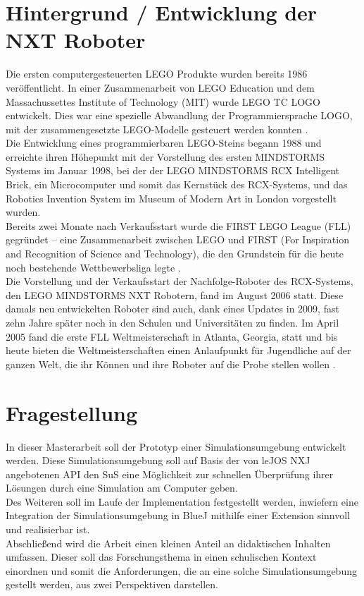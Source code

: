 \documentclass[paper=a4, pagesize, DIV=calc, BCOR=12.5mm, twoside=on, onecolumn=on, open = any, titlepage =on, parskip =half-, headsepline = on, footsepline = on, chapterprefix = on, appendixprefix = off, fontsize = 12pt, numbers = noenddot, abstract = on]{scrbook}
\numberwithin{equation}{chapter}
\begin{document}
\par \singlespacing
\section*{Hintergrund / Entwicklung der NXT Roboter}
\onehalfspacing
Die ersten computergesteuerten LEGO Produkte wurden bereits 1986 veröffentlicht. In einer Zusammenarbeit von LEGO Education und dem Massachussettes Institute of Technology (MIT) wurde LEGO TC LOGO entwickelt. Dies war eine spezielle Abwandlung der Programmiersprache LOGO, mit der zusammengesetzte LEGO-Modelle gesteuert werden konnten \cite{rolling:14}.\\
Die Entwicklung eines programmierbaren LEGO-Steins begann 1988 und erreichte ihren Höhepunkt mit der Vorstellung des ersten MINDSTORMS Systems im Januar 1998, bei der der LEGO MINDSTORMS RCX Intelligent Brick, ein Microcomputer und somit das Kernstück des RCX-Systems, und das Robotics Invention System im Museum of Modern Art in London vorgestellt wurden.\\
Bereits zwei Monate nach Verkaufsstart wurde die FIRST LEGO League (FLL) gegründet -- eine Zusammenarbeit zwischen LEGO und FIRST (For Inspiration and Recognition of Science and Technology), die den Grundstein für die heute noch bestehende Wettbewerbsliga legte \cite{rolling:14}.\\
Die Vorstellung und der Verkaufsstart der Nachfolge-Roboter des RCX-Systems, den LEGO MINDSTORMS NXT Robotern, fand im August 2006 statt. Diese damals neu entwickelten Roboter sind auch, dank eines Updates in 2009, fast zehn Jahre später noch in den Schulen und Universitäten zu finden. Im April 2005 fand die erste FLL Weltmeisterschaft in Atlanta, Georgia, statt und bis heute bieten die Weltmeisterschaften einen Anlaufpunkt für Jugendliche auf der ganzen Welt, die ihr Können und ihre Roboter auf die Probe stellen wollen \cite{lego}.

\par \singlespacing
\section*{Fragestellung}
\onehalfspacing
In dieser Masterarbeit soll der Prototyp einer Simulationsumgebung entwickelt werden. Diese Simulationsumgebung soll auf Basis der von leJOS NXJ angebotenen API den SuS eine Möglichkeit zur schnellen Überprüfung ihrer Lösungen durch eine Simulation am Computer geben.\\
Des Weiteren soll im Laufe der Implementation festgestellt werden, inwiefern eine Integration der Simulationsumgebung in BlueJ mithilfe einer Extension sinnvoll und realisierbar ist.\\
Abschließend wird die Arbeit einen kleinen Anteil an didaktischen Inhalten umfassen. Dieser soll das Forschungsthema in einen schulischen Kontext einordnen und somit die Anforderungen, die an eine solche Simulationsumgebung gestellt werden, aus zwei Perspektiven darstellen.\\
\end{document}
